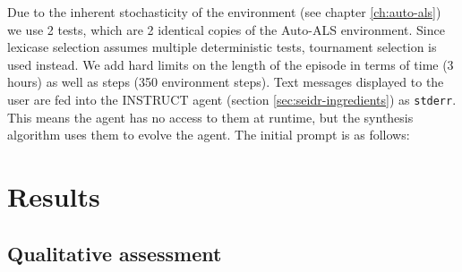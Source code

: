 Due to the inherent stochasticity of the environment (see chapter \ref{ch:auto-als}) we use 2 tests, which are 2 identical copies of the Auto-ALS environment.
Since lexicase selection assumes multiple deterministic tests, tournament selection is used instead.
We add hard limits on the length of the episode in terms of time (3 hours) as well as steps (350 environment steps).
Text messages displayed to the user are fed into the INSTRUCT agent (section \ref{sec:seidr-ingredients}) as \texttt{stderr}.
This means the agent has no access to them at runtime, but the synthesis algorithm uses them to evolve the agent.
The initial prompt is as follows:



\newpage
\section{Results}

\subsection{Qualitative assessment}



